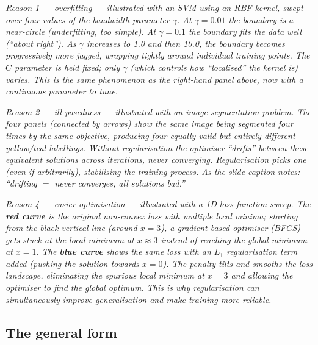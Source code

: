 \documentclass[11pt, a4paper]{article}
\begin{document}
\begin{center}

\footnotesize\textit{Reason 1 --- \emph{overfitting} --- illustrated with an SVM using an RBF kernel, swept over four values of the bandwidth parameter $\gamma$. At $\gamma = 0.01$ the boundary is a near-circle (underfitting, too simple). At $\gamma = 0.1$ the boundary fits the data well (``about right''). As $\gamma$ increases to 1.0 and then 10.0, the boundary becomes progressively more jagged, wrapping tightly around individual training points. The $C$ parameter is held fixed; only $\gamma$ (which controls how ``localised'' the kernel is) varies. This is the same phenomenon as the right-hand panel above, now with a continuous parameter to tune.}
\end{center}

\begin{center}

\footnotesize\textit{Reason 2 --- \emph{ill-posedness} --- illustrated with an image segmentation problem. The four panels (connected by arrows) show the same image being segmented four times by the \emph{same} objective, producing four equally valid but entirely different yellow/teal labellings. Without regularisation the optimiser ``drifts'' between these equivalent solutions across iterations, never converging. Regularisation picks one (even if arbitrarily), stabilising the training process. As the slide caption notes: ``drifting $=$ never converges, all solutions bad.''}
\end{center}

\begin{center}

\footnotesize\textit{Reason 4 --- \emph{easier optimisation} --- illustrated with a 1D loss function sweep. The \textbf{red curve} is the original non-convex loss with multiple local minima; starting from the black vertical line (around $x = 3$), a gradient-based optimiser (BFGS) gets stuck at the local minimum at $x \approx 3$ instead of reaching the global minimum at $x = 1$. The \textbf{blue curve} shows the same loss with an $L_1$ regularisation term added (pushing the solution towards $x = 0$). The penalty tilts and smooths the loss landscape, eliminating the spurious local minimum at $x = 3$ and allowing the optimiser to find the global optimum. This is why regularisation can simultaneously improve generalisation \emph{and} make training more reliable.}
\end{center}

\subsection{The general form}
\end{document}
